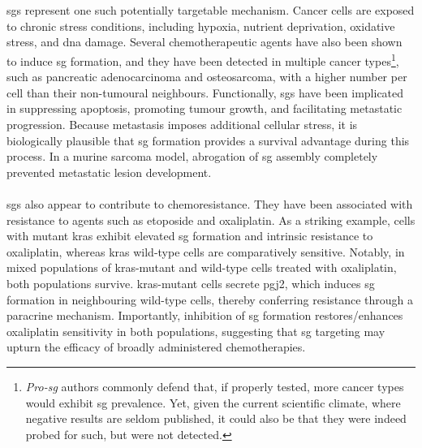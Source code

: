 \\
\\
\glspl{sg} represent one such potentially targetable mechanism. Cancer cells are exposed to chronic stress conditions, including hypoxia, nutrient deprivation, oxidative stress, and \gls{dna} damage\cite{redding_stress_2023}. Several chemotherapeutic agents have also been shown to induce \gls{sg} formation\cite{lee_stress_2022}, and they have been detected in multiple cancer types\footnote{\textit{Pro-\gls{sg}} authors commonly defend that, if properly tested, more cancer types would exhibit \gls{sg} prevalence. Yet, given the current scientific climate, where negative results are seldom published\cite{fanelli_negative_2012}, it could also be that they were indeed probed for such, but were not detected.}, such as pancreatic adenocarcinoma\cite{fonteneau_stress_2022} and osteosarcoma\cite{somasekharan_yb-1_2015}, with a higher number per cell than their non-tumoural neighbours. Functionally, \glspl{sg} have been implicated in suppressing apoptosis\cite{arimoto_formation_2008, thedieck_inhibition_2013}, promoting tumour growth\cite{fonteneau_stress_2022}, and facilitating metastatic progression\cite{somasekharan_yb-1_2015}. Because metastasis imposes additional cellular stress, it is biologically plausible that \gls{sg} formation provides a survival advantage during this process\cite{somasekharan_yb-1_2015}. In a murine sarcoma model, abrogation of \gls{sg} assembly completely prevented metastatic lesion development\cite{somasekharan_yb-1_2015}.
\\
\\
\glspl{sg} also appear to contribute to chemoresistance. They have been associated with resistance to agents such as etoposide\cite{arimoto_formation_2008} and oxaliplatin\cite{grabocka_mutant_2016}. As a striking example, cells with mutant \gls{kras} exhibit elevated \gls{sg} formation and intrinsic resistance to oxaliplatin, whereas \gls{kras} wild-type cells are comparatively sensitive\cite{grabocka_mutant_2016}. Notably, in mixed populations of \gls{kras}-mutant and wild-type cells treated with oxaliplatin, both populations survive\cite{grabocka_mutant_2016}. \gls{kras}-mutant cells secrete \gls{pgj2}, which induces \gls{sg} formation in neighbouring wild-type cells, thereby conferring resistance through a paracrine mechanism\cite{grabocka_mutant_2016}. Importantly, inhibition of \gls{sg} formation restores/enhances oxaliplatin sensitivity in both populations, suggesting that \gls{sg} targeting may upturn the efficacy of broadly administered chemotherapies\cite{grabocka_mutant_2016}.
